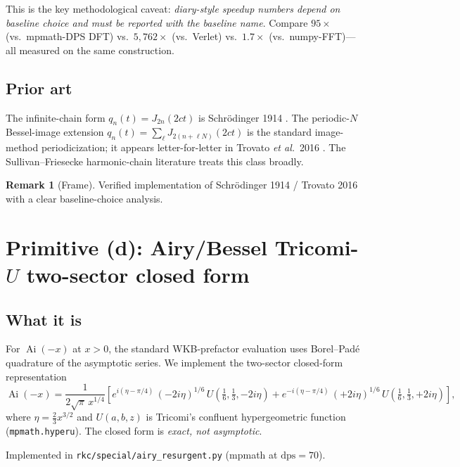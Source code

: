 \documentclass[11pt,reqno]{amsart}
\theoremstyle{definition}
\newtheorem{remark}[theorem]{Remark}
\DeclareMathOperator{\Ai}{Ai}
\newcommand{\dps}{\mathrm{dps}}
\begin{document}
This is the key methodological caveat: \emph{diary-style speedup
numbers depend on baseline choice and must be reported with the
baseline name}. Compare $95\times$ (vs.\ mpmath-DPS DFT) vs.\
$5{,}762\times$ (vs.\ Verlet) vs.\ $1.7\times$ (vs.\ numpy-FFT)---all
measured on the same construction.

\subsection{Prior art}
The infinite-chain form $q_n(t) = J_{2n}(2 c t)$ is Schr\"odinger 1914
\cite{Schrodinger1914}. The periodic-$N$ Bessel-image extension
$q_n(t) = \sum_\ell J_{2(n + \ell N)}(2 c t)$ is the standard
image-method periodicization; it appears letter-for-letter in
Trovato \emph{et al.}~2016 \cite{Trovato2016}. The Sullivan--Friesecke
harmonic-chain literature treats this class broadly.

\begin{remark}[Frame]
Verified implementation of Schr\"odinger 1914 / Trovato 2016 with a
clear baseline-choice analysis.
\end{remark}

\section{Primitive (d): Airy/Bessel Tricomi-\texorpdfstring{$U$}{U} two-sector closed form}\label{sec:airy}

\subsection{What it is}
For $\Ai(-x)$ at $x > 0$, the standard WKB-prefactor evaluation uses
Borel--Pad\'e quadrature of the asymptotic series. We implement the
two-sector closed-form representation
\begin{equation}\label{eq:airy-tricomi}
\Ai(-x) = \frac{1}{2 \sqrt{\pi} \, x^{1/4}} \left[
e^{i(\eta - \pi/4)} \, (-2 i \eta)^{1/6} \, U\!\left(\tfrac{1}{6}, \tfrac{1}{3}, -2 i \eta\right)
+ e^{-i(\eta - \pi/4)} \, (+2 i \eta)^{1/6} \, U\!\left(\tfrac{1}{6}, \tfrac{1}{3}, +2 i \eta\right)
\right],
\end{equation}
where $\eta = \tfrac{2}{3} x^{3/2}$ and $U(a, b, z)$ is Tricomi's
confluent hypergeometric function (\verb|mpmath.hyperu|). The closed
form is \emph{exact, not asymptotic}.

Implemented in \verb|rkc/special/airy_resurgent.py| (mpmath at
$\dps = 70$).
\end{document}
